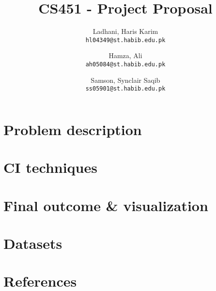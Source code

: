\documentclass[11pt,letterpaper]{article}
\newcommand{\bibent}{\noindent \hangindent 40pt}
\newenvironment{reference}{\newpage \section*{References} }{\newpage }
\begin{document}
\title{CS451 - Project Proposal}
\author{Ladhani, Haris Karim\\
\texttt{hl04349@st.habib.edu.pk}
\and
Hamza, Ali\\
\texttt{ah05084@st.habib.edu.pk}
\and
Samson, Synclair Saqib\\
\texttt{ss05901@st.habib.edu.pk}
}
\maketitle


\section*{Problem description}


\section*{CI techniques}


\section*{Final outcome \& visualization}


\section*{Datasets} 


\begin{reference}
  \bibent

\end{reference}
\end{document}
